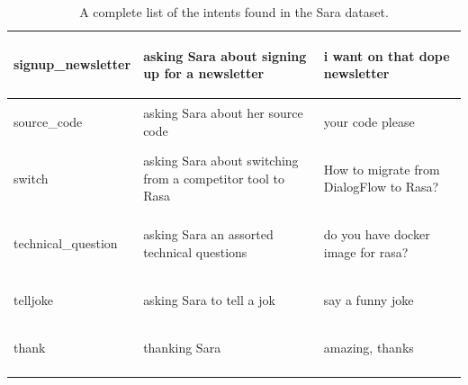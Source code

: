 \documentclass[bsc,frontabs,singlespacing,parskip,deptreport]{infthesis}
\begin{document}
{\begin{center}
\begin{longtable}{p{}|p{}|p{}}
    \hline
    \begin{spverbatim}signup_newsletter\end{spverbatim} & asking Sara about signing up for a newsletter & \begin{spverbatim}i want on that dope newsletter\end{spverbatim} \\
    \hline
    \begin{spverbatim}source_code\end{spverbatim} & asking Sara about her source code & \begin{spverbatim}your code please\end{spverbatim} \\
    \hline
    \begin{spverbatim}switch\end{spverbatim} & asking Sara about switching from a competitor tool to Rasa & \begin{spverbatim}How to migrate from DialogFlow to Rasa?\end{spverbatim} \\
    \hline
    \begin{spverbatim}technical_question\end{spverbatim} & asking Sara an assorted technical questions & \begin{spverbatim}do you have docker image for rasa?\end{spverbatim} \\
    \hline
    \begin{spverbatim}telljoke\end{spverbatim} & asking Sara to tell a jok & \begin{spverbatim}say a funny joke\end{spverbatim} \\
    \hline
    \begin{spverbatim}thank\end{spverbatim} & thanking Sara & \begin{spverbatim}amazing, thanks\end{spverbatim} \\
    \hline
    \caption{A complete list of the intents found in the Sara dataset.}
    \label{tab:sara-intent-list}
    \end{longtable}
  \end{center}
}
\end{document}
